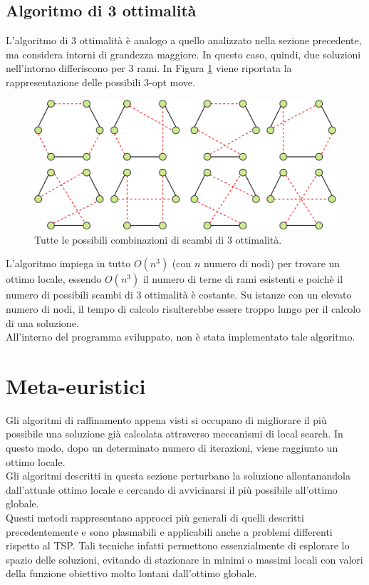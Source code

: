 \subsection{Algoritmo di 3 ottimalità}
L'algoritmo di 3 ottimalità è analogo a quello analizzato nella sezione precedente, ma considera intorni di grandezza maggiore. In questo caso, quindi, due soluzioni nell'intorno differiscono per 3 rami. In Figura \ref{three_optimality} viene riportata la rappresentazione delle possibili 3-opt move.
\begin{figure}[H] 
\begin{center} 
  \includegraphics[scale=0.35]{Images/3_swap}
  \caption{\footnotesize{Tutte le possibili combinazioni di scambi di 3 ottimalità.}}
  \label{three_optimality}
\end{center}
\end{figure}
L'algoritmo impiega in tutto $O(n^3)$ (con $n$ numero di nodi) per trovare un ottimo locale, essendo $O(n^3)$ il numero di terne di rami esistenti e poichè il numero di possibili scambi di 3 ottimalità è costante. Su istanze con un elevato numero di nodi, il tempo di calcolo risulterebbe essere troppo lungo per il calcolo di una soluzione.\\
All'interno del programma sviluppato, non è stata implementato tale algoritmo.

\section{Meta-euristici}
Gli algoritmi di raffinamento appena visti si occupano di migliorare il più possibile una soluzione già calcolata attraverso meccanismi di local search. In questo modo, dopo un determinato numero di iterazioni, viene raggiunto un ottimo locale.\\
Gli algoritmi descritti in questa sezione perturbano la soluzione allontanandola dall'attuale ottimo locale e cercando di avvicinarsi il più possibile all'ottimo globale.\\
Questi metodi rappresentano approcci più generali di quelli descritti precedentemente e sono plasmabili e applicabili anche a problemi differenti rispetto al TSP. Tali tecniche infatti permettono essenzialmente di esplorare lo spazio delle soluzioni, evitando di stazionare in minimi o massimi locali con valori della funzione obiettivo molto lontani dall'ottimo globale.

